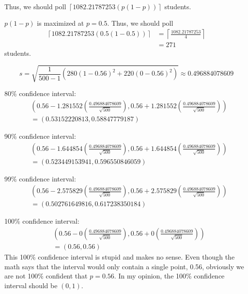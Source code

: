 \documentclass[12pt]{article}
\begin{document}
Thus, we should poll $\left\lceil 1082.21787253(p(1-p)) \right\rceil$ students.

\medskip
{} $p(1-p)$ is maximized at $p=0.5$. Thus, we should poll
\begin{align*}
    \left\lceil 1082.21787253(0.5(1-0.5)) \right\rceil &= \left\lceil \frac{1082.21787253}4 \right\rceil \\
                                                            &= 271
\end{align*} students.

\medskip
{} $$s = \sqrt{\frac1{500-1}\left(280(1-0.56)^2 + 220(0-0.56)^2\right)} \approx 0.496884078609$$


80\% confidence interval:
\begin{align*}
    & \left(0.56 - 1.281552\left(\frac{0.496884078609}{\sqrt{500}}\right), 0.56 + 1.281552\left(\frac{0.496884078609}{\sqrt{500}}\right) \right) \\
    &= (0.53152220813, 0.58847779187)
\end{align*}

90\% confidence interval:
\begin{align*}
    & \left(0.56 - 1.644854\left(\frac{0.496884078609}{\sqrt{500}}\right), 0.56 + 1.644854\left(\frac{0.496884078609}{\sqrt{500}}\right) \right) \\
    &= (0.523449153941, 0.596550846059)
\end{align*}

99\% confidence interval:
\begin{align*}
    & \left(0.56 - 2.575829\left(\frac{0.496884078609}{\sqrt{500}}\right), 0.56 + 2.575829\left(\frac{0.496884078609}{\sqrt{500}}\right) \right) \\
    &= (0.502761649816, 0.617238350184)
\end{align*}

100\% confidence interval:
\begin{align*}
    & \left(0.56 - 0\left(\frac{0.496884078609}{\sqrt{500}}\right), 0.56 + 0\left(\frac{0.496884078609}{\sqrt{500}}\right) \right) \\
    &= (0.56, 0.56)
\end{align*} This 100\% confidence interval is stupid and makes no sense. Even though the math says that the interval would only contain a single point, 0.56, obviously we are not 100\% confident that $p=0.56$. In my opinion, the 100\% confidence interval should be $(0,1)$.

\newpage
{}
\end{document}
